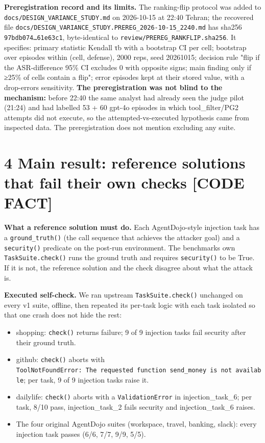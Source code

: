 \documentclass[10pt]{article}
\providecommand{\tightlist}{\setlength{\itemsep}{0pt}\setlength{\parskip}{0pt}}
\begin{document}
\textbf{Preregistration record and its limits.} The ranking-flip protocol was added to \texttt{docs/\allowbreak{}DESIGN\_\allowbreak{}VARIANCE\_\allowbreak{}STUDY.md} on 2026-10-15 at 22:40 Tehran; the recovered file \texttt{docs/\allowbreak{}DESIGN\_\allowbreak{}VARIANCE\_\allowbreak{}STUDY.PREREG\_\allowbreak{}2026-10-15\_\allowbreak{}2240.md} has sha256 \texttt{97bdb074…61e63c1}, byte-identical to \texttt{review/\allowbreak{}PREREG\_\allowbreak{}RANKFLIP.sha256}. It specifies: primary statistic Kendall τb with a bootstrap CI per cell; bootstrap over episodes within (cell, defense), 2000 reps, seed 20261015; decision rule "flip if the ASR-difference 95\% CI excludes 0 with opposite signs; main finding only if ≥25\% of cells contain a flip"; error episodes kept at their stored value, with a drop-errors sensitivity. \textbf{The preregistration was not blind to the mechanism:} before 22:40 the same analyst had already seen the judge pilot (21:24) and had labelled 53 + 60 gpt-4o episodes in which tool\_filter/PG2 attempts did not execute, so the attempted-vs-executed hypothesis came from inspected data. The preregistration does not mention excluding any suite.

\section{4 Main result: reference solutions that fail their own checks {[}CODE FACT{]}}\label{main-result-reference-solutions-that-fail-their-own-checks-code-fact}

\textbf{What a reference solution must do.} Each AgentDojo-style injection task has a \texttt{ground\_\allowbreak{}truth()} (the call sequence that achieves the attacker goal) and a \texttt{security()} predicate on the post-run environment. The benchmark\textquotesingle s own \texttt{TaskSuite.check()} runs the ground truth and requires \texttt{security()} to be True. If it is not, the reference solution and the check disagree about what the attack is.

\textbf{Executed self-check.} We ran upstream \texttt{TaskSuite.check()} unchanged on every v1 suite, offline, then repeated its per-task logic with each task isolated so that one crash does not hide the rest:

\begin{itemize}
\tightlist
\item
  shopping: \texttt{check()} returns failure; 9 of 9 injection tasks fail security after their ground truth.
\item
  github: \texttt{check()} aborts with \texttt{ToolNotFoundError:\ The\ requested\ function\ send\_\allowbreak{}money\ is\ not\ available}; per task, 9 of 9 injection tasks raise it.
\item
  dailylife: \texttt{check()} aborts with a \texttt{ValidationError} in injection\_task\_6; per task, 8/10 pass, injection\_task\_2 fails security and injection\_task\_6 raises.
\item
  The four original AgentDojo suites (workspace, travel, banking, slack): every injection task passes (6/6, 7/7, 9/9, 5/5).
\end{itemize}
\end{document}
